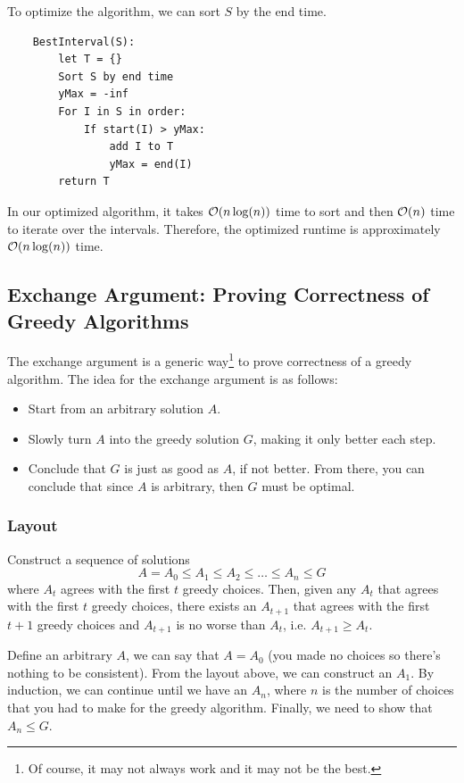 \documentclass[letterpaper]{article}
\begin{document}
\bigskip 

To optimize the algorithm, we can sort $S$ by the end time. 
\begin{verbatim}
    BestInterval(S):
        let T = {}
        Sort S by end time
        yMax = -inf 
        For I in S in order: 
            If start(I) > yMax: 
                add I to T 
                yMax = end(I)
        return T
\end{verbatim}
In our optimized algorithm, it takes $\mathcal{O}(n\log(n))$ time to sort and then $\mathcal{O}(n)$ time to iterate over the intervals. Therefore, the optimized runtime is approximately $\mathcal{O}(n\log(n))$ time. 

\subsection{Exchange Argument: Proving Correctness of Greedy Algorithms}
The exchange argument is a generic way\footnote{Of course, it may not always work and it may not be the best.} to prove correctness of a greedy algorithm. The idea for the exchange argument is as follows: 
\begin{itemize}
    \item Start from an arbitrary solution $A$. 
    \item Slowly turn $A$ into the greedy solution $G$, making it only better each step. 
    \item Conclude that $G$ is just as good as $A$, if not better. From there, you can conclude that since $A$ is arbitrary, then $G$ must be optimal. 
\end{itemize}

\subsubsection{Layout}
Construct a sequence of solutions 
\[A = A_0 \leq A_1 \leq A_2 \leq \dots \leq A_n \leq G\]
where $A_t$ agrees with the first $t$ greedy choices. Then, given any $A_t$ that agrees with the first $t$ greedy choices, there exists an $A_{t + 1}$ that agrees with the first $t + 1$ greedy choices and $A_{t + 1}$ is no worse than $A_t$, i.e. $A_{t + 1} \geq A_t$.

\bigskip 

Define an arbitrary $A$, we can say that $A = A_0$ (you made no choices so there's nothing to be consistent). From the layout above, we can construct an $A_1$. By induction, we can continue until we have an $A_n$, where $n$ is the number of choices that you had to make for the greedy algorithm. Finally, we need to show that $A_n \leq G$. 
\end{document}
